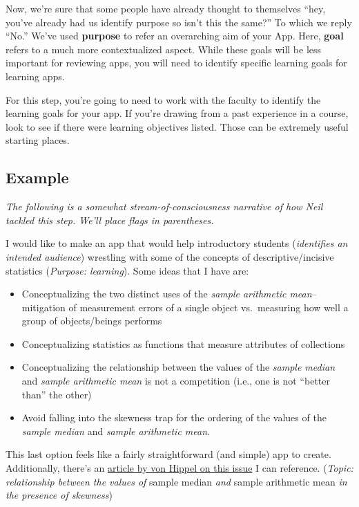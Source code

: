 \documentclass[
]{book}
\providecommand{\tightlist}{%
  \setlength{\itemsep}{0pt}\setlength{\parskip}{0pt}}
\begin{document}
Now, we're sure that some people have already thought to themselves ``hey, you've already had us identify purpose so isn't this the same?'' To which we reply ``No.'' We've used \textbf{purpose} to refer an overarching aim of your App. Here, \textbf{goal} refers to a much more contextualized aspect. While these goals will be less important for reviewing apps, you will need to identify specific learning goals for learning apps.

For this step, you're going to need to work with the faculty to identify the learning goals for your app. If you're drawing from a past experience in a course, look to see if there were learning objectives listed. Those can be extremely useful starting places.

\hypertarget{example}{%
\subsection{Example}\label{example}}

\emph{The following is a somewhat stream-of-consciousness narrative of how Neil tackled this step. We'll place flags in parentheses.}

I would like to make an app that would help introductory students (\emph{identifies an intended audience}) wrestling with some of the concepts of descriptive/incisive statistics (\emph{Purpose: learning}). Some ideas that I have are:

\begin{itemize}
\tightlist
\item
  Conceptualizing the two distinct uses of the \emph{sample arithmetic mean}--mitigation of measurement errors of a single object vs.~measuring how well a group of objects/beings performs
\item
  Conceptualizing statistics as functions that measure attributes of collections
\item
  Conceptualizing the relationship between the values of the \emph{sample median} and \emph{sample arithmetic mean} is not a competition (i.e., one is not ``better than'' the other)
\item
  Avoid falling into the skewness trap for the ordering of the values of the \emph{sample median} and \emph{sample arithmetic mean}.
\end{itemize}

This last option feels like a fairly straightforward (and simple) app to create. Additionally, there's an \href{http://jse.amstat.org/v13n2/vonhippel.html}{article by von Hippel on this issue} I can reference. (\emph{Topic: relationship between the values of }sample median \emph{and} sample arithmetic mean \emph{in the presence of skewness})
\end{document}
